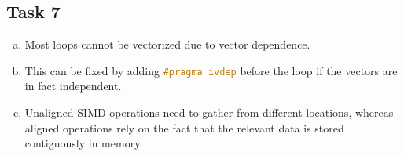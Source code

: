 \documentclass[11pt]{article}
\begin{document}
    \subsection*{Task 7}
    \label{subsec:Task7}
    \begin{enumerate}[a)]
        \item Most loops cannot be vectorized due to vector dependence.
        \item This can be fixed by adding
        \lstinline[language=c++, basicstyle=\footnotesize]{#pragma ivdep}
        before the loop if the vectors are in fact independent.
        \item Unaligned SIMD operations need to gather from different
        locations, whereas aligned operations rely on the fact that the
        relevant data is stored contiguously in memory.
    \end{enumerate}
\end{document}
